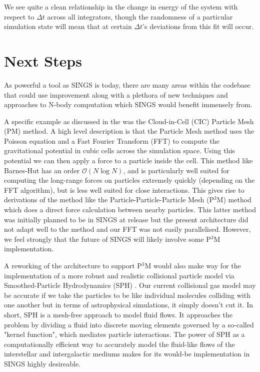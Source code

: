 \documentclass[12pt, twoside, letterpaper]{article}
\begin{document}
We see quite a clean relationship in the change in energy of the system with respect to $\Delta t$ across all integrators, though the randomness of a particular simulation state will mean that at certain $\Delta t$'s deviations from this fit will occur. 

\section{Next Steps} \label{sec:nextsteps}
As powerful a tool as SINGS is today, there are many areas within the codebase that could use improvement along with a plethora of new techniques and approaches to N-body computation which SINGS would benefit immensely from.

A specific example as discussed in the  was the Cloud-in-Cell (CIC) Particle Mesh (PM) method. A high level description is that the Particle Mesh method uses the Poisson equation and a Fast Fourier Transform (FFT) to compute the gravitational potential in cubic cells across the simulation space. Using this potential we can then apply a  force to a particle inside the cell. This method like Barnes-Hut has an order $\mathcal{O}(N \log N)$, and is particularly well suited for computing the long-range forces on particles extremely quickly (depending on the FFT algorithm), but is less well suited for close interactions. This gives rise to derivations of the method like the Particle-Particle-Particle Mesh (P$^3$M) method \citep{hockney1988particle} which does a direct force calculation between nearby particles. This latter method was initially planned to be in SINGS at release but the present architecture did not adapt well to the method and our FFT was not easily parallelised. However, we feel strongly that the future of SINGS will likely involve some P$^3$M implementation.

A reworking of the architecture to support P$^3$M would also make way for the implementation of a more robust and realistic collisional particle model via Smoothed-Particle Hydrodynamics (SPH) \citep{gingold1977smoothed}. Our current collisional gas model may be accurate if we take the particles to be like individual molecules colliding with one another but in terms of astrophysical simulations, it simply doesn't cut it. In short, SPH is a mesh-free approach to model fluid flows. It approaches the problem by dividing a fluid into discrete moving elements governed by a so-called "kernel function", which mediates particle interactions. The power of SPH as a computationally efficient way to accurately model the fluid-like flows of the interstellar and intergalactic mediums makes for its would-be implementation in SINGS highly desireable. 
\end{document}
